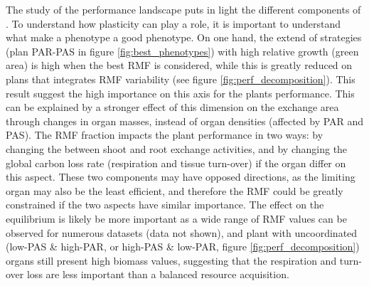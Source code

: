 The study of the performance landscape puts in light the different components of . To understand how plasticity can play a role, it is important to understand what make a phenotype a good phenotype. 
On one hand, the extend of strategies (plan PAR-PAS in figure \ref{fig:best_phenotypes}) with high relative growth (green area) is high when the best  RMF is considered, while this is greatly reduced on plans that integrates RMF variability (see figure \ref{fig:perf_decomposition}). This result suggest the high importance on this axis for the plants performance. This can be explained by a stronger effect of this dimension on the exchange area through changes in organ masses, instead of organ densities (affected by PAR and PAS). The RMF fraction impacts the plant performance in two ways: by changing the  between shoot and root exchange activities, and by changing the global carbon loss rate (respiration and tissue turn-over) if the organ differ on this aspect. These two components may have opposed directions, as the limiting organ may also be the least efficient, and therefore the RMF could be greatly constrained if the two aspects have similar importance. The effect on the equilibrium is likely be more important as a wide range of RMF values can be observed for numerous datasets (data not shown), and plant with uncoordinated (low-PAS \& high-PAR, or high-PAS \& low-PAR, \see figure \ref{fig:perf_decomposition}) organs still present high biomass values, suggesting that the respiration and turn-over loss are less important than a balanced resource acquisition. 


